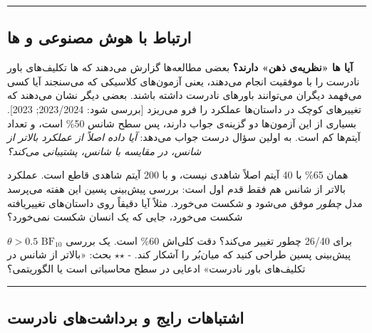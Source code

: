 \begin{center}\rule{0.5\linewidth}{0.5pt}\end{center}

\subsection{\texorpdfstring{ارتباط با هوش مصنوعی و
ها}{ارتباط با هوش مصنوعی و LLMها}}

\textbf{آیا ها «نظریه‌ی ذهن»  دارند؟} بعضی
مطالعه‌ها گزارش می‌دهند که ها تکلیف‌های باور نادرست  را با موفقیت انجام می‌دهند، یعنی آزمون‌های کلاسیکی که می‌سنجند آیا
کسی می‌فهمد دیگران می‌توانند باورهای نادرست داشته باشند. بعضی دیگر نشان
می‌دهند که تغییرهای کوچک در داستان‌ها عملکرد را فرو می‌ریزد {[}بررسی شود:
 2023/2024;  2023{]}. بسیاری از این آزمون‌ها دو
گزینه‌ی جواب دارند، پس سطح شانس 50\% است، و تعداد آیتم‌ها کم است.
 به اولین سؤال درست جواب می‌دهد: \emph{آیا داده اصلاً از
عملکرد بالاتر از شانس، در مقایسه با شانس، پشتیبانی می‌کند؟}

همان 65\% با 40 آیتم اصلاً شاهدی نیست، و با 200 آیتم شاهدی قاطع است.
عملکرد بالاتر از شانس هم فقط قدم اول است: بررسی پیش‌بینی پسین این هفته
می‌پرسد مدل \emph{چطور} موفق می‌شود و شکست می‌خورد. مثلاً آیا دقیقاً روی
داستان‌های تغییریافته شکست می‌خورد، جایی که یک انسان شکست نمی‌خورد؟

\(\theta > 0.5\) \(\mathrm{BF}_{10}\) برای 26/40 چطور تغییر می‌کند؟ دقت
کلی‌اش 60\% است. یک بررسی پیش‌بینی پسین طراحی کنید که میان‌بُر را آشکار کند.
- \ensuremath{\star}\ensuremath{\star} بحث: «بالاتر از شانس در تکلیف‌های باور نادرست» ادعایی در سطح
محاسباتی  است یا الگوریتمی؟

\begin{center}\rule{0.5\linewidth}{0.5pt}\end{center}

\subsection{اشتباهات رایج و برداشت‌های نادرست}

